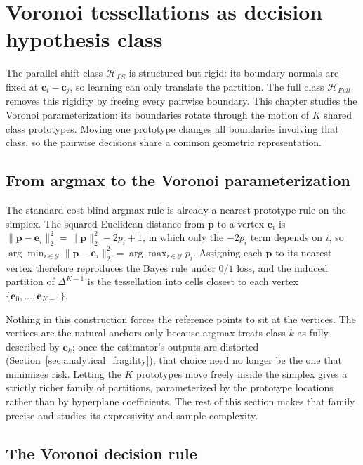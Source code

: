 \chapter{Voronoi tessellations as decision hypothesis class}\label{sec:voronoi_tessellation}

The parallel-shift class $\mathcal{H}_{PS}$ is structured but rigid: its boundary normals are fixed at $\mathbf{c}_i-\mathbf{c}_j$, so learning can only translate the partition. The full class $\mathcal{H}_{Full}$ removes this rigidity by freeing every pairwise boundary. This chapter studies the Voronoi parameterization: its boundaries rotate through the motion of $K$ shared class prototypes. Moving one prototype changes all boundaries involving that class, so the pairwise decisions share a common geometric representation.

\section{From argmax to the Voronoi parameterization}

The standard cost-blind argmax rule is already a nearest-prototype rule on the simplex. The squared Euclidean distance from $\mathbf{p}$ to a vertex $\mathbf{e}_i$ is $\|\mathbf{p} - \mathbf{e}_i\|_2^2 = \|\mathbf{p}\|_2^2 - 2 p_i + 1$, in which only the $-2 p_i$ term depends on $i$, so $\arg\min_{i \in \mathcal{Y}} \|\mathbf{p} - \mathbf{e}_i\|_2^2 = \arg\max_{i \in \mathcal{Y}} p_i$. Assigning each $\mathbf{p}$ to its nearest vertex therefore reproduces the Bayes rule under $0/1$ loss, and the induced partition of $\Delta^{K-1}$ is the tessellation into cells closest to each vertex $\{\mathbf{e}_0, \ldots, \mathbf{e}_{K-1}\}$.

Nothing in this construction forces the reference points to sit at the vertices. The vertices are the natural anchors only because argmax treats class $k$ as fully described by $\mathbf{e}_k$; once the estimator's outputs are distorted (Section~\ref{sec:analytical_fragility}), that choice need no longer be the one that minimizes risk. Letting the $K$ prototypes move freely inside the simplex gives a strictly richer family of partitions, parameterized by the prototype locations rather than by hyperplane coefficients. The rest of this section makes that family precise and studies its expressivity and sample complexity.

\section{The Voronoi decision rule}\label{sec:voronoi_rule}

